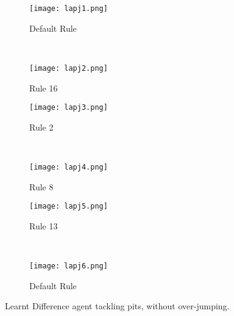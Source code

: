 \begin{figure}[m]
	\begin{adjustwidth}{-2cm}{-2cm}
    \centering
          \begin{subfigure}[b]{0.49\textwidth}
                  \centering
                  \texttt{[image: lapj1.png]}
                  \caption{Default Rule}
                  \vspace*{\baselineskip}
          \end{subfigure}~
          \begin{subfigure}[b]{0.49\textwidth}
                  \centering
                  \texttt{[image: lapj2.png]}
                  \caption{Rule 16}
                  \vspace*{\baselineskip}
          \end{subfigure}
          \begin{subfigure}[b]{0.49\textwidth}
                  \centering
                  \texttt{[image: lapj3.png]}
                  \caption{Rule 2}
                  \vspace*{\baselineskip}
          \end{subfigure}~
          \begin{subfigure}[b]{0.49\textwidth}
                  \centering
                  \texttt{[image: lapj4.png]}
                  \caption{Rule 8}
                  \vspace*{\baselineskip}
          \end{subfigure}
          \begin{subfigure}[b]{0.49\textwidth}
                  \centering
                  \texttt{[image: lapj5.png]}
                  \caption{Rule 13}
                  \vspace*{\baselineskip}
          \end{subfigure}~
          \begin{subfigure}[b]{0.49\textwidth}
                  \centering
                  \texttt{[image: lapj6.png]}
                  \caption{Default Rule}
                  \vspace*{\baselineskip}
          \end{subfigure}
    \caption{Learnt Difference agent tackling pits, without over-jumping.}\label{fig:lapj}
    \end{adjustwidth}
\end{figure}



